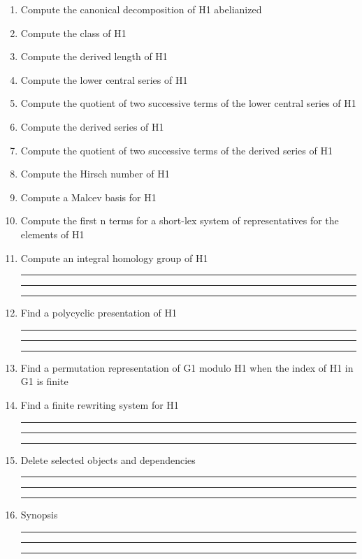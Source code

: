 \begin{enumerate}
\item Compute the canonical decomposition of H1 abelianized

\item Compute the class of H1

\item Compute the derived length of H1

\item Compute the lower central series of H1

\item Compute the quotient of two successive terms of the lower central
series of H1

\item Compute the derived series of H1

\item Compute the quotient of two successive terms of the derived series
of H1

\item Compute the Hirsch number of H1

\item Compute a Malcev basis for H1

\item Compute the first n terms for a short-lex system of representatives for the
elements of H1

\item Compute an integral homology group of H1

\bigskip
\hrule\hrule\hrule

\item Find a polycyclic presentation of H1

\bigskip
\hrule\hrule\hrule

\item Find a permutation representation of G1
modulo H1 when the index of H1 in G1 is finite

\item Find a finite rewriting system for H1

\bigskip
\hrule\hrule\hrule


\item Delete selected objects and dependencies

\bigskip
\hrule\hrule\hrule

\item
Synopsis

\bigskip
\hrule\hrule\hrule

\end{enumerate}
